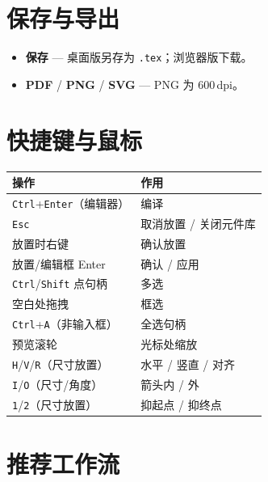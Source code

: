 \documentclass[a4paper]{ltxdoc}
\newcommand{\ui}[1]{\textbf{#1}}
\newcommand{\key}[1]{\texttt{#1}}
\begin{document}
\section{保存与导出}

\begin{itemize}[nosep]
  \item \ui{保存} --- 桌面版另存为 \texttt{.tex}；浏览器版下载。
  \item \ui{PDF} / \ui{PNG} / \ui{SVG} --- PNG 为 600\,dpi。
\end{itemize}

\section{快捷键与鼠标}

\begin{center}
{\small
\begin{tabular}{@{}ll@{}}
\toprule
操作 & 作用 \\
\midrule
\key{Ctrl}+\key{Enter}（编辑器） & 编译 \\
\key{Esc} & 取消放置 / 关闭元件库 \\
放置时右键 & 确认放置 \\
放置/编辑框 Enter & 确认 / 应用 \\
\key{Ctrl}/\key{Shift} 点句柄 & 多选 \\
空白处拖拽 & 框选 \\
\key{Ctrl}+\key{A}（非输入框） & 全选句柄 \\
预览滚轮 & 光标处缩放 \\
\key{H}/\key{V}/\key{R}（尺寸放置） & 水平 / 竖直 / 对齐 \\
\key{I}/\key{O}（尺寸/角度） & 箭头内 / 外 \\
\key{1}/\key{2}（尺寸放置） & 抑起点 / 抑终点 \\
\bottomrule
\end{tabular}}
\end{center}

\section{推荐工作流}
\end{document}
